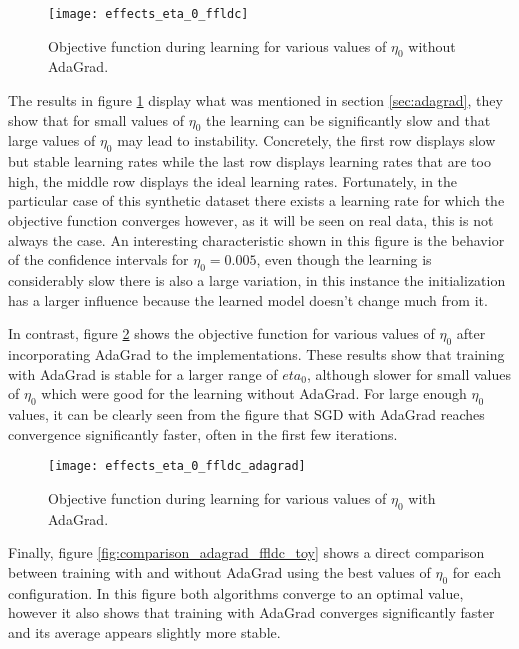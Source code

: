\begin{figure}
  \centering
  \texttt{[image: effects\_eta\_0\_ffldc]}
  \caption{Objective function during learning for various values of $\eta_0$ without AdaGrad.}
  \label{fig:effects_eta_0}
\end{figure}

The results in figure \ref{fig:effects_eta_0} display what was mentioned in section \ref{sec:adagrad}, they show that for small values of $\eta_0$ the learning can be significantly slow and that large values of $\eta_0$ may lead to instability. Concretely,  the first row displays slow but stable learning rates while the last row displays learning rates that are too high, the middle row displays the ideal learning rates. Fortunately, in the particular case of this synthetic dataset there exists a learning rate for which the objective function converges however, as it will be seen on real data, this is not always the case. An interesting characteristic shown in this figure is the behavior of the confidence intervals for $\eta_0 = 0.005$, even though the learning is considerably slow there is also a large variation, in this instance the initialization has a larger influence because the learned model doesn't change much from it.

In contrast, figure \ref{fig:effects_adagrad} shows the objective function for various values of $\eta_{0}$ after incorporating AdaGrad to the implementations. These results show that training with AdaGrad is stable for a larger range of $eta_0$, although slower for small values of $\eta_{0}$ which were good for the learning without AdaGrad. For large enough $\eta_0$ values, it can be clearly seen from the figure that SGD with AdaGrad reaches convergence significantly faster, often in the first few iterations.

\begin{figure}
  \centering
  \texttt{[image: effects\_eta\_0\_ffldc\_adagrad]}
  \caption{Objective function during learning for various values of $\eta_0$ with AdaGrad.}
  \label{fig:effects_adagrad}
\end{figure}

Finally, figure \ref{fig:comparison_adagrad_ffldc_toy} shows a direct comparison between training with and without AdaGrad using the best values of $\eta_0$ for each configuration. In this figure both algorithms converge to an optimal value, however it also shows that training with AdaGrad converges significantly faster and its average appears slightly more stable.

